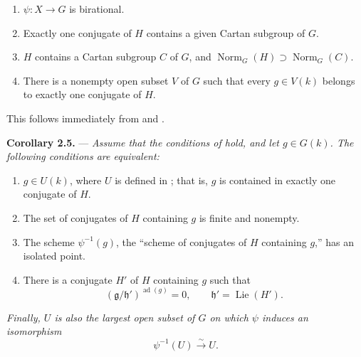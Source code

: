 \begin{enumerate}
\item[(i)] 
  \(\psi:X\to G\) is birational.
\item[(ii)] 
  Exactly one conjugate of \(H\) contains a given Cartan subgroup of
  \(G\).
\item[(iii)] 
  \(H\) contains a Cartan subgroup \(C\) of \(G\), and
  \(\operatorname{Norm}_G(H)\supset\operatorname{Norm}_G(C)\).
\item[(iv)] 
  There is a nonempty open subset \(V\) of \(G\) such that every
  \(g\in V(k)\) belongs to exactly one conjugate of \(H\).
\end{enumerate}

This follows immediately from  and .

\medskip
\noindent{}\textbf{Corollary 2.5.} ---
\textit{Assume that the conditions of  hold, and let
\(g\in G(k)\). The following conditions are equivalent:}

\begin{enumerate}
\item[(i)] 
  \(g\in U(k)\), where \(U\) is defined in ; that is, \(g\) is
  contained in exactly one conjugate of \(H\).
\item[(ii)] 
  The set of conjugates of \(H\) containing \(g\) is finite and
  nonempty.
\item[(iii)] 
  The scheme \(\psi^{-1}(g)\), the ``scheme of conjugates of \(H\)
  containing \(g\),'' has an isolated point.
\item[(iv)] 
  There is a conjugate \(H'\) of \(H\) containing \(g\) such that
  \[
    (\mathfrak g/\mathfrak h')^{\operatorname{ad}(g)}=0,
    \qquad \mathfrak h'=\operatorname{Lie}(H').
  \]
\end{enumerate}

\textit{Finally, \(U\) is also the largest open subset of \(G\) on
which \(\psi\) induces an isomorphism}
\[
  \psi^{-1}(U)\xrightarrow{\sim}U.
\]

